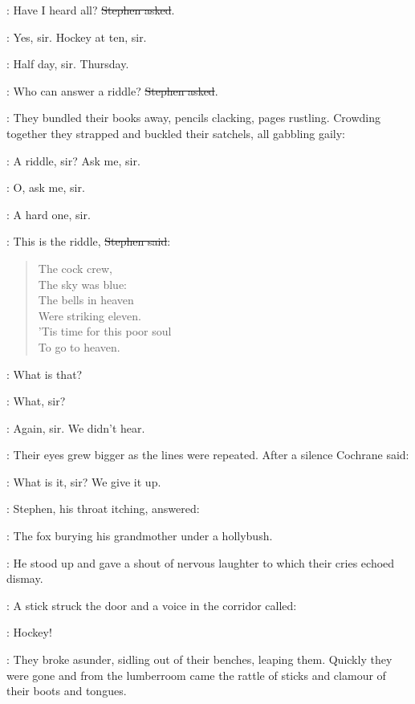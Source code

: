 \Stephen:
Have I heard all?
\sout{Stephen asked}.

\talbot:
Yes, sir. Hockey at ten, sir.

\armstrong:
Half day, sir.
Thursday.

\Stephen:
Who can answer a riddle?
\sout{Stephen asked}.

:
They bundled their books away, pencils clacking, pages rustling.
Crowding together they strapped and buckled their satchels, all gabbling gaily:

\comyn:
A riddle, sir?
Ask me, sir.

\armstrong:
O, ask me, sir.

\cochrane:
A hard one, sir.

\Stephen:
This is the riddle,
\sout{Stephen said}:

\begin{verse}
    The cock crew, \\
    The sky was blue: \\
    The bells in heaven \\
    Were striking eleven. \\
    'Tis time for this poor soul \\
    To go to heaven.
\end{verse}

\Stephen:
What is that?

\comyn:
What, sir?

\armstrong:
Again, sir.
We didn't hear.

:
Their eyes grew bigger as the lines were repeated.
After a silence Cochrane said:

\cochrane:
What is it, sir?
We give it up.

:
Stephen, his throat itching, answered:

\Stephen:
The fox burying his grandmother under a hollybush.

:
He stood up and gave a shout of nervous laughter
to which their cries echoed dismay.

:
A stick struck the door and a voice in the corridor called:

\deasy:
Hockey!

:
They broke asunder, sidling out of their benches, leaping them.
Quickly they were gone
and from the lumberroom came the rattle of sticks
and clamour of their boots and tongues.
